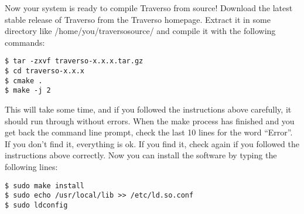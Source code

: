 Now your system is ready to compile Traverso from source! Download the latest stable release of Traverso from the Traverso homepage. Extract it in some directory like /home/you/traversosource/ and compile it with the following commands:

\begin{verbatim}
$ tar -zxvf traverso-x.x.x.tar.gz
$ cd traverso-x.x.x
$ cmake .
$ make -j 2
\end{verbatim}

This will take some time, and if you followed the instructions above carefully, it should run through without errors. When the make process has finished and you get back the  command line prompt, check the last 10 lines for the word ``Error''. If you don't find it, everything is ok. If you find it, check again if you followed the instructions above correctly. Now you can install the software by typing the following lines:

\begin{verbatim}
$ sudo make install
$ sudo echo /usr/local/lib >> /etc/ld.so.conf
$ sudo ldconfig
\end{verbatim}

